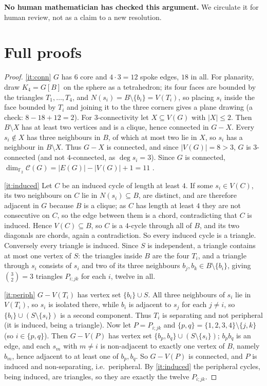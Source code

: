 \documentclass[11pt,a4paper]{article}
\theoremstyle{plain}
\theoremstyle{definition}
\theoremstyle{remark}
\newcommand{\F}{\mathbb F_2}
\newcommand{\cyc}{\mathcal C}
\begin{document}
\textbf{No human mathematician has checked this argument.} We circulate it for human review, not as a claim to a new resolution.

\appendix

\section{Full proofs}\label{app:proofs}

\label{pf:structure}
\lemstructure*
\begin{proof}
\ref{it:conn} $G$ has $6$ core and $4\cdot3=12$ spoke edges, $18$ in all. For planarity, draw $K_4=G[B]$ on the sphere as a tetrahedron; its four faces are bounded by the triangles $T_1,\dots,T_4$, and $N(s_i)=B\setminus\{b_i\}=V(T_i)$, so placing $s_i$ inside the face bounded by $T_i$ and joining it to the three corners gives a plane drawing (a check: $8-18+12=2$). For $3$-connectivity let $X\subseteq V(G)$ with $|X|\le2$. Then $B\setminus X$ has at least two vertices and is a clique, hence connected in $G-X$. Every $s_i\notin X$ has three neighbours in $B$, of which at most two lie in $X$, so $s_i$ has a neighbour in $B\setminus X$. Thus $G-X$ is connected, and since $|V(G)|=8>3$, $G$ is $3$-connected (and not $4$-connected, as $\deg s_i=3$). Since $G$ is connected, $\dim_{\F}\cyc(G)=|E(G)|-|V(G)|+1=11$ \cite[\S1.9]{Diestel}.

\ref{it:induced} Let $C$ be an induced cycle of length at least $4$. If some $s_i\in V(C)$, its two neighbours on $C$ lie in $N(s_i)\subseteq B$, are distinct, and are therefore adjacent in $G$ because $B$ is a clique; as $C$ has length at least $4$ they are not consecutive on $C$, so the edge between them is a chord, contradicting that $C$ is induced. Hence $V(C)\subseteq B$, so $C$ is a $4$-cycle through all of $B$, and its two diagonals are chords, again a contradiction. So every induced cycle is a triangle. Conversely every triangle is induced. Since $S$ is independent, a triangle contains at most one vertex of $S$: the triangles inside $B$ are the four $T_i$, and a triangle through $s_i$ consists of $s_i$ and two of its three neighbours $b_j,b_k\in B\setminus\{b_i\}$, giving $\binom32=3$ triangles $P_{i;jk}$ for each $i$, twelve in all.

\ref{it:periph} $G-V(T_i)$ has vertex set $\{b_i\}\cup S$. All three neighbours of $s_i$ lie in $V(T_i)$, so $s_i$ is isolated there, while $b_i$ is adjacent to $s_j$ for each $j\ne i$, so $\{b_i\}\cup(S\setminus\{s_i\})$ is a second component. Thus $T_i$ is separating and not peripheral (it is induced, being a triangle). Now let $P=P_{i;jk}$ and $\{p,q\}=\{1,2,3,4\}\setminus\{j,k\}$ (so $i\in\{p,q\}$). Then $G-V(P)$ has vertex set $\{b_p,b_q\}\cup(S\setminus\{s_i\})$; $b_pb_q$ is an edge, and each $s_m$ with $m\ne i$ is non-adjacent to exactly one vertex of $B$, namely $b_m$, hence adjacent to at least one of $b_p,b_q$. So $G-V(P)$ is connected, and $P$ is induced and non-separating, i.e.\ peripheral. By \ref{it:induced} the peripheral cycles, being induced, are triangles, so they are exactly the twelve $P_{i;jk}$.


\end{proof}
\end{document}
